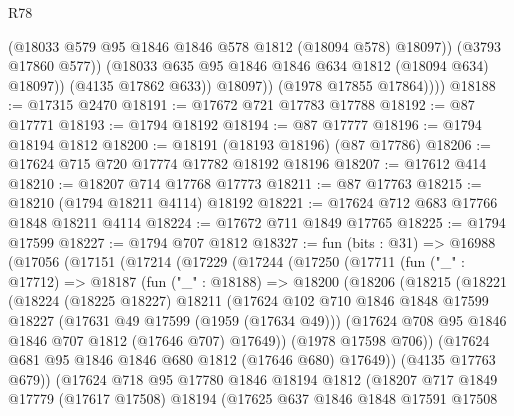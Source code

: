 \begin{lexlean}{R78}
\begin{coremodule}
                      (@18033 @579 @95 @1846 @1846 @578 @1812 (@18094 @578) @18097))
                    (@3793 @17860 @577))
                  (@18033 @635 @95 @1846 @1846 @634 @1812 (@18094 @634) @18097))
                (@4135 @17862 @633))
              @18097))
          (@1978 @17855 @17864))))
@18188 := @17315 @2470
@18191 := @17672 @721 @17783 @17788
@18192 := @87 @17771
@18193 := @1794 @18192
@18194 := @87 @17777
@18196 := @1794 @18194 @1812
@18200 := @18191 (@18193 @18196) (@87 @17786)
@18206 := @17624 @715 @720 @17774 @17782 @18192 @18196
@18207 := @17612 @414
@18210 := @18207 @714 @17768 @17773
@18211 := @87 @17763
@18215 := @18210 (@1794 @18211 @4114) @18192
@18221 := @17624 @712 @683 @17766 @1848 @18211 @4114
@18224 := @17672 @711 @1849 @17765
@18225 := @1794 @17599
@18227 := @1794 @707 @1812
@18327 := fun (bits : @31) =>
  @16988
    (@17056
      (@17151
        (@17214
          (@17229
            (@17244
              (@17250
                (@17711
                  (fun ("_" : @17712) =>
                  @18187
                    (fun ("_" : @18188) =>
                    @18200
                      (@18206
                        (@18215
                          (@18221
                            (@18224
                              (@18225 @18227)
                              @18211
                              (@17624
                                @102
                                @710
                                @1846
                                @1848
                                @17599
                                @18227
                                (@17631 @49 @17599 (@1959 (@17634 @49)))
                                (@17624 @708 @95 @1846 @1846 @707 @1812 (@17646 @707) @17649))
                              (@1978 @17598 @706))
                            (@17624 @681 @95 @1846 @1846 @680 @1812 (@17646 @680) @17649))
                          (@4135 @17763 @679))
                        (@17624
                          @718
                          @95
                          @17780
                          @1846
                          @18194
                          @1812
                          (@18207
                            @717
                            @1849
                            @17779
                            (@17617 @17508)
                            @18194
                            (@17625
                              @637
                              @1846
                              @1848
                              @17591
                              @17508

\end{coremodule}
\end{lexlean}
